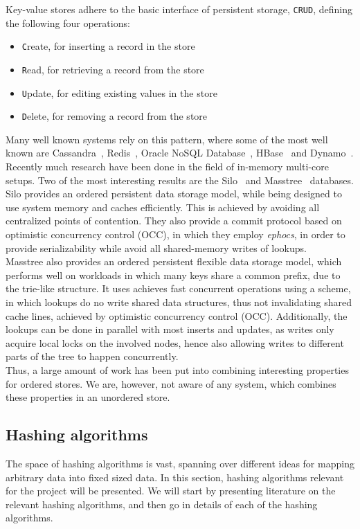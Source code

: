 \documentclass[11pt]{article} %
\begin{document}
Key-value stores adhere to the basic interface of persistent storage, \verb|CRUD|, defining the following four operations:
\begin{itemize}
  \item \verb|C|reate, for inserting a record in the store
  \item \verb|R|ead, for retrieving a record from the store
  \item \verb|U|pdate, for editing existing values in the store
  \item \verb|D|elete, for removing a record from the store
\end{itemize}
Many well known systems rely on this pattern, where some of the most well known are Cassandra~\cite{cassandra}, Redis~\cite{redis}, Oracle NoSQL Database~\cite{oracle}, HBase~\cite{hbase} and Dynamo~\cite{dynamo}. Recently much research have been done in the field of in-memory multi-core setups. Two of the most interesting results are the Silo~\cite{SILO13} and Masstree~\cite{MT12} databases. \\

Silo provides an ordered persistent data storage model, while being designed to use system memory and caches efficiently. This is achieved by avoiding all centralized points of contention. They also provide a commit protocol based on optimistic concurrency control (OCC), in which they employ \emph{ephocs}, in order to provide serializability while avoid all shared-memory writes of lookups. \\

Masstree also provides an ordered persistent flexible data storage model, which performs well on workloads in which many keys share a common prefix, due to the trie-like structure. It uses achieves fast concurrent operations using a scheme, in which lookups do no write shared data structures, thus not invalidating shared cache lines, achieved by optimistic concurrency control (OCC). Additionally, the lookups can be done in parallel with most inserts and updates, as writes only acquire local locks on the involved nodes, hence also allowing writes to different parts of the tree to happen concurrently. \\

Thus, a large amount of work has been put into combining interesting properties for ordered stores. We are, however, not aware of any system, which combines these properties in an unordered store. \\

\subsection{Hashing algorithms}
\label{subsec:background_hashing_algorithms}
The space of hashing algorithms is vast, spanning over different ideas for mapping arbitrary data into fixed sized data. In this section, hashing algorithms relevant for the project will be presented. We will start by presenting literature on the relevant hashing algorithms, and then go in details of each of the hashing algorithms.
\end{document}
